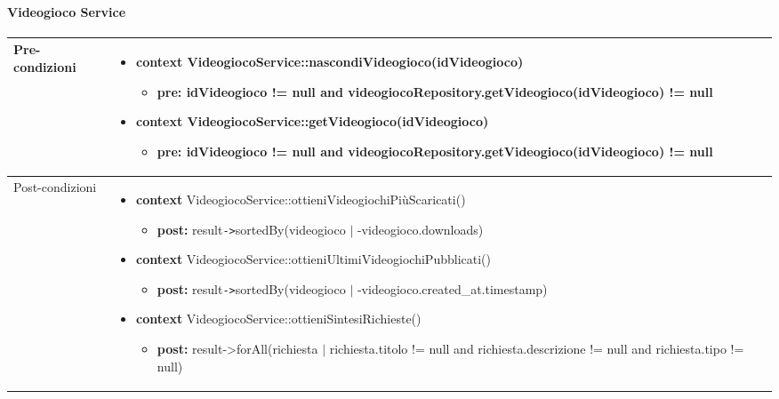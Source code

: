 \paragraph{Videogioco Service}
\small\begin{tabular}{|| l | p{28em} ||} 
	\hline
	Pre-condizioni & \begin{itemize}[leftmargin=*]
		\item \textbf{context} VideogiocoService::nascondiVideogioco(idVideogioco)
		\begin{itemize}
			\item[ ] \textbf{pre:} idVideogioco != null and videogiocoRepository.getVideogioco(idVideogioco) != null
		\end{itemize}

		\item \textbf{context} VideogiocoService::getVideogioco(idVideogioco)
		\begin{itemize}
			\item[ ] \textbf{pre:} idVideogioco != null and videogiocoRepository.getVideogioco(idVideogioco) != null
		\end{itemize}
	\end{itemize}\\
	\hline
	Post-condizioni & \begin{itemize}[leftmargin=*]
		\item \textbf{context} VideogiocoService::ottieniVideogiochiPiùScaricati()
		\begin{itemize}
			\item[ ] \textbf{post:} result\verb|->|sortedBy(videogioco $|$ -videogioco.downloads)
		\end{itemize}

		\item \textbf{context} VideogiocoService::ottieniUltimiVideogiochiPubblicati()
		\begin{itemize}
			\item[ ] \textbf{post:} result\verb|->|sortedBy(videogioco $|$ -videogioco.created\_at.timestamp)
		\end{itemize}

		\item \textbf{context} VideogiocoService::ottieniSintesiRichieste()
		\begin{itemize}
			\item[ ] \textbf{post:} result->forAll(richiesta $|$ richiesta.titolo != null and richiesta.descrizione != null and richiesta.tipo != null)
		\end{itemize}


\end{itemize}
\end{tabular}
